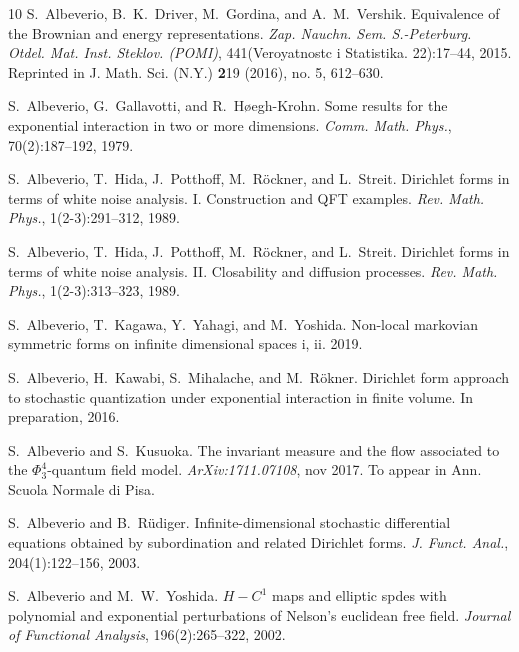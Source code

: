\documentclass[a4paper,10pt]{article}
\newcommand{\tmtextbf}[1]{{\bfseries{#1}}}
\newcommand{\tmtextit}[1]{{\itshape{#1}}}
\begin{document}
\begin{thebibliography}{10}
  S.~Albeverio, B.~K.~Driver, M.~Gordina, and 
  A.~M.~Vershik. {\newblock}Equivalence of the Brownian and energy
  representations. {\newblock}\tmtextit{Zap. Nauchn. Sem. S.-Peterburg. Otdel.
  Mat. Inst. Steklov. (POMI)}, 441(Veroyatnostc i Statistika. 22):17--44,
  2015. {\newblock}Reprinted in J. Math. Sci. (N.Y.) \tmtextbf{2}19 (2016),
  no. 5, 612--630.{\newblock}
  
  S.~Albeverio, G.~Gallavotti, and  R.~H{\o}egh-Krohn.
  {\newblock}Some results for the exponential interaction in two or more
  dimensions. {\newblock}\tmtextit{Comm. Math. Phys.}, 70(2):187--192,
  1979.{\newblock}
  
  S.~Albeverio, T.~Hida, J.~Potthoff, M.~R{\"o}ckner, and
  L.~Streit. {\newblock}Dirichlet forms in terms of white noise analysis. I.
  Construction and QFT examples. {\newblock}\tmtextit{Rev. Math. Phys.},
  1(2-3):291--312, 1989.{\newblock}
  
  S.~Albeverio, T.~Hida, J.~Potthoff, M.~R{\"o}ckner, and
  L.~Streit. {\newblock}Dirichlet forms in terms of white noise analysis. II.
  Closability and diffusion processes. {\newblock}\tmtextit{Rev. Math. Phys.},
  1(2-3):313--323, 1989.{\newblock}
  
  S.~Albeverio, T.~Kagawa, Y.~Yahagi, and  M.~Yoshida.
  {\newblock}Non-local markovian symmetric forms on infinite dimensional
  spaces i, ii. {\newblock}2019.{\newblock}
  
  S.~Albeverio, H.~Kawabi, S.~Mihalache, and 
  M.~R{\"o}kner. {\newblock}Dirichlet form approach to stochastic quantization
  under exponential interaction in finite volume. {\newblock}In preparation,
  2016.{\newblock}
  
  S.~Albeverio  and  S.~Kusuoka.
  {\newblock}The invariant measure and the flow associated to the
  $\Phi^4_3$-quantum field model. {\newblock}\tmtextit{ArXiv:1711.07108}, nov
  2017. {\newblock}To appear in Ann. Scuola Normale di Pisa.{\newblock}
  
  S.~Albeverio  and  B.~R{\"u}diger.
  {\newblock}Infinite-dimensional stochastic differential equations obtained
  by subordination and related Dirichlet forms. {\newblock}\tmtextit{J. Funct.
  Anal.}, 204(1):122--156, 2003.{\newblock}
  
  S.~Albeverio  and  M.~W.~Yoshida. {\newblock}$H -
  C^1$ maps and elliptic spdes with polynomial and exponential perturbations
  of Nelson's euclidean free field. {\newblock}\tmtextit{Journal of Functional
  Analysis}, 196(2):265--322, 2002.{\newblock}
  

\end{thebibliography}
\end{document}
